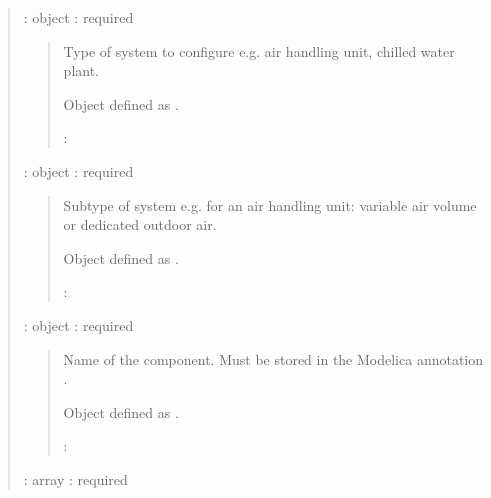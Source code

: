 \documentclass[letterpaper,10pt, openany,english]{sphinxmanual}
\begin{document}
\begin{quote}

 : object : required
\begin{quote}

\begin{DUlineblock}{0em}
\item[] Type of system to configure e.g. air handling unit, chilled water plant.
\item[] Object defined as {\hyperref[\detokenize{requirements:elementary-object}]{}}.
\end{DUlineblock}

 : 
\end{quote}

 : object : required
\begin{quote}

\begin{DUlineblock}{0em}
\item[] Subtype of system e.g. for an air handling unit: variable air volume or dedicated outdoor air.
\item[] Object defined as {\hyperref[\detokenize{requirements:elementary-object}]{}}.
\end{DUlineblock}

 : 
\end{quote}

 : object : required
\begin{quote}

\begin{DUlineblock}{0em}
\item[] Name of the component. Must be stored in the Modelica annotation .
\item[] Object defined as {\hyperref[\detokenize{requirements:elementary-object}]{}}.
\end{DUlineblock}

 : 
\end{quote}

 : array : required
\begin{quote}


\end{quote}
\end{quote}
\end{document}
